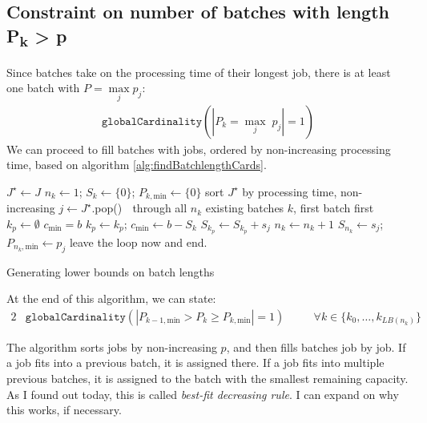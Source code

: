 \subsection{Constraint on number of batches with length
{\sansitalicfont P\textsubscript{k}} > {\sansitalicfont p}}

Since batches take on the processing time of their longest job, there is at
least one batch with $P = \underset{j}{\max} p_j $:
\begin{align}
\mathtt{globalCardinality}( |P_k = \underset{j}{\max} \; p_j| = 1 ) 
\end{align}
We can proceed to fill batches with jobs, ordered by non-increasing processing
time, based on algorithm \ref{alg:findBatchlengthCards}.
\begin{algorithm}
\fontsize{9pt}{11.5pt}\selectfont
\begin{algorithmic}
\State $J^{\star} \gets J$ 
\State $n_k \gets 1$; $S_k \gets \{0\}$; $P_{k,\text{min}} \gets \{0\}$ 
\State sort $J^{\star}$ by processing time, non-increasing
\Repeat
  \State $j \gets J^{\star}$.pop() 
  \Loop $\;$ through all $n_k$ existing batches $k$, first batch first
    \State $k_p \gets \emptyset$ 
    \State $c_\text{min} = b$ 
      \State $k_p \gets k_p$; $c_\text{min} \gets b-S_k$
    \EndIf
  \EndLoop
      \State $S_{k_p} \gets S_{k_p} + s_j$ 
  \Else
      \State $n_k \gets n_k + 1$
      \State $S_{n_k} \gets s_j$; $P_{n_k,\text{min}} \gets p_j$ 
    \Else
      \State leave the loop now and end.
    \EndIf
  \EndIf
{}
\end{algorithmic}
\caption{Generating lower bounds on batch lengths}
\label{alg:findBatchlengthCards}
\end{algorithm}

At the end of this algorithm, we can state:
\begin{alignat}{2}
& \mathtt{globalCardinality}( |P_{k-1,\text{min}} > P_k \geq P_{k,\text{min}} | =
1) \quad && \forall k \in \{k_0,\dots,k_{LB(n_k)}\}
\end{alignat}

The algorithm sorts jobs by non-increasing $p$, and then fills batches job by
job. If a job fits into a previous batch, it is assigned there. If a job fits
into multiple previous batches, it is assigned to the batch with the smallest
remaining capacity. {\color{darkred} As I found out today, this is called
\textit{best-fit decreasing rule}. I can expand on why this works, if
necessary.}

